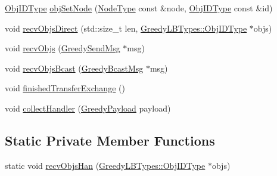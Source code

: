 \begin{DoxyCompactItemize}
\item 
\hyperlink{structvt_1_1vrt_1_1collection_1_1lb_1_1_base_l_b_a790b22acf448880599724749cdc4e9b3}{Obj\+I\+D\+Type} \hyperlink{structvt_1_1vrt_1_1collection_1_1lb_1_1_greedy_l_b_a38efce04a8fabdc16d89331b639f534f}{obj\+Set\+Node} (\hyperlink{namespacevt_a866da9d0efc19c0a1ce79e9e492f47e2}{Node\+Type} const \&node, \hyperlink{structvt_1_1vrt_1_1collection_1_1lb_1_1_base_l_b_a790b22acf448880599724749cdc4e9b3}{Obj\+I\+D\+Type} const \&id)
\item 
void \hyperlink{structvt_1_1vrt_1_1collection_1_1lb_1_1_greedy_l_b_a9d03bddd3f8266b68c4e0d0c8671f86e}{recv\+Objs\+Direct} (std\+::size\+\_\+t len, \hyperlink{structvt_1_1vrt_1_1collection_1_1lb_1_1_greedy_l_b_types_ae22670acd689e4ff83315fac2e4acb5e}{Greedy\+L\+B\+Types\+::\+Obj\+I\+D\+Type} $\ast$objs)
\item 
void \hyperlink{structvt_1_1vrt_1_1collection_1_1lb_1_1_greedy_l_b_a984461093fa3a1a5f8be9444d3e4c3f4}{recv\+Objs} (\hyperlink{structvt_1_1vrt_1_1collection_1_1lb_1_1_greedy_send_msg}{Greedy\+Send\+Msg} $\ast$msg)
\item 
void \hyperlink{structvt_1_1vrt_1_1collection_1_1lb_1_1_greedy_l_b_a0fce6ced2d28e1828ad5a414117f63c0}{recv\+Objs\+Bcast} (\hyperlink{structvt_1_1vrt_1_1collection_1_1lb_1_1_greedy_bcast_msg}{Greedy\+Bcast\+Msg} $\ast$msg)
\item 
void \hyperlink{structvt_1_1vrt_1_1collection_1_1lb_1_1_greedy_l_b_aa2cdba9feec93e48d7cce1886a4eaa6a}{finished\+Transfer\+Exchange} ()
\item 
void \hyperlink{structvt_1_1vrt_1_1collection_1_1lb_1_1_greedy_l_b_a3466c598044fc1536c3dcbaa2a9980ce}{collect\+Handler} (\hyperlink{structvt_1_1vrt_1_1collection_1_1lb_1_1_greedy_payload}{Greedy\+Payload} payload)
\end{DoxyCompactItemize}
\subsection*{Static Private Member Functions}
\begin{DoxyCompactItemize}
\item 
static void \hyperlink{structvt_1_1vrt_1_1collection_1_1lb_1_1_greedy_l_b_a2590d9a14ee124f30d86557f3cc5fb25}{recv\+Objs\+Han} (\hyperlink{structvt_1_1vrt_1_1collection_1_1lb_1_1_greedy_l_b_types_ae22670acd689e4ff83315fac2e4acb5e}{Greedy\+L\+B\+Types\+::\+Obj\+I\+D\+Type} $\ast$objs)
\end{DoxyCompactItemize}
